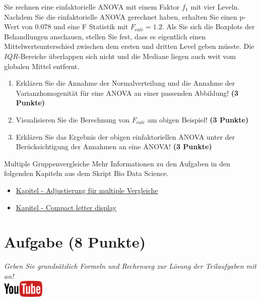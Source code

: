 \documentclass[a4paper, 9pt]{scrartcl}\usepackage[]{graphicx}\usepackage[]{xcolor}
\begin{document}
Sie rechnen eine einfaktorielle ANOVA mit einem Faktor $f_1$ mit
vier Leveln. Nachdem Sie die einfaktorielle ANOVA gerechnet
haben, erhalten Sie einen p-Wert von $0.078$ und eine F Statistik mit
$F_{calc} = 1.2$. Als Sie sich die Boxplots der Behandlungen anschauen,
stellen Sie fest, dass es eigentlich einen Mittelwertsunterschied zwischen
dem ersten und dritten Level geben m{\"u}sste. Die
$IQR$-Bereiche {\"u}berlappen sich nicht und die Mediane liegen auch weit vom
globalen Mittel entfernt.


\begin{enumerate}
\item Erkl{\"a}ren Sie die Annahme der Normalverteilung und die Annahme der
  Varianzhomogenit{\"a}t f{\"u}r eine ANOVA an einer passenden Abbildung! \textbf{(3 Punkte)}
\item Visualisieren Sie die Berechnung von $F_{calc}$ am obigen Beispiel!
  \textbf{(3 Punkte)}
\item Erkl{\"a}ren Sie das Ergebnis der obigen einfaktoriellen ANOVA unter der
  Ber{\"u}cksichtigung der Annahmen an eine ANOVA! \textbf{(3 Punkte)}
\end{enumerate}

 
\clearpage
\begin{graybox}{Multiple Gruppenvergleiche}
Mehr Informationen zu den Aufgaben in den folgenden Kapiteln aus dem Skript Bio Data Science.
  \begin{itemize}
  \item \href{https://jkruppa.github.io/stat-tests-theorie.html}{Kapitel - Adjustierung für multiple Vergleiche}
  \item \href{https://jkruppa.github.io/stat-tests-posthoc.html}{Kapitel - Compact letter display}
  \end{itemize}
\end{graybox}
\clearpage

\section{Aufgabe \hfill (8 Punkte)}

\textit{Geben Sie grunds{\"a}tzlich Formeln und Rechenweg zur L{\"o}sung der
  Teilaufgaben mit an!} \\[1Ex]

 \hfill\href{https://youtu.be/hr_jPd1hpKY}{\includegraphics[width =
   2cm]{img/youtube}}\\[1Ex]
\end{document}
